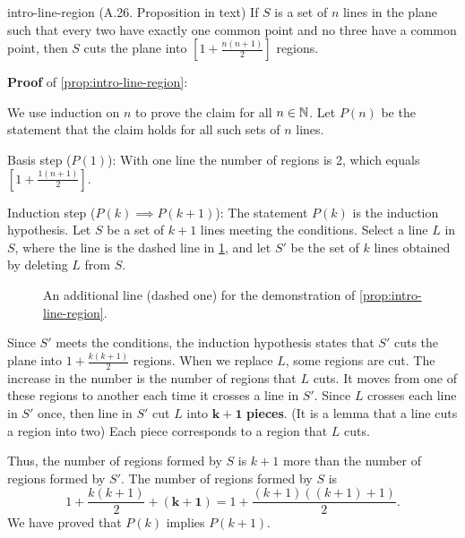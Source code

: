 \documentclass[../src/handouts/main.tex]{subfiles}
\begin{document}
\begin{proposition}{}{intro-line-region}
  (A.26. Proposition in text)
  If $S$ is a set of $n$ lines in the plane such that every two have exactly one common point and no three have a common point, then $S$ cuts the plane into $\left[ 1 + \frac{n (n + 1)}{2} \right]$ regions.
\end{proposition}

\textbf{Proof} of \cref{prop:intro-line-region}:

We use induction on $n$ to prove the claim for all $n \in \mathbb{N}$.
Let $P(n)$ be the statement that the claim holds for all such sets of $n$ lines.

Basis step ($P(1)$): With one line the number of regions is 2, which equals $\left[ 1 + \frac{1 (n + 1)}{2} \right]$.

Induction step ($P(k) \implies P(k + 1)$): The statement $P(k)$ is the induction hypothesis. Let $S$ be a set of $k + 1$ lines meeting the conditions. Select a line $L$ in $S$, where the line is the dashed line in \cref{fig:intro-line-region-additional}, and let $S'$ be the set of $k$ lines obtained by deleting $L$ from $S$.

\begin{figure}
  \centering
  \caption{An additional line (dashed one) for the demonstration of \cref{prop:intro-line-region}.}
  \label{fig:intro-line-region-additional}
\end{figure}

Since $S'$ meets the conditions, the induction hypothesis states that $S'$ cuts the plane into $1 + \frac{k (k + 1)}{2}$ regions.
When we replace $L$, some regions are cut.
The increase in the number is the number of regions that $L$ cuts. It moves from one of these regions to another each time it crosses a line in $S'$.
Since $L$ crosses each line in $S'$ once, then line in $S'$ cut $L$ into $\bm{k + 1}$ \textbf{pieces}. (It is a lemma that a line cuts a region into two)
Each piece corresponds to a region that $L$ cuts.

Thus, the number of regions formed by $S$ is $k + 1$ more than the number of regions formed by $S'$.
The number of regions formed by $S$ is
$$
  1 + \frac{k (k + 1)}{2} + \bm{(k + 1)} = 1 + \frac{(k + 1)((k + 1) + 1)}{2}.
$$
We have proved that $P(k)$ implies $P(k + 1)$.
\end{document}
